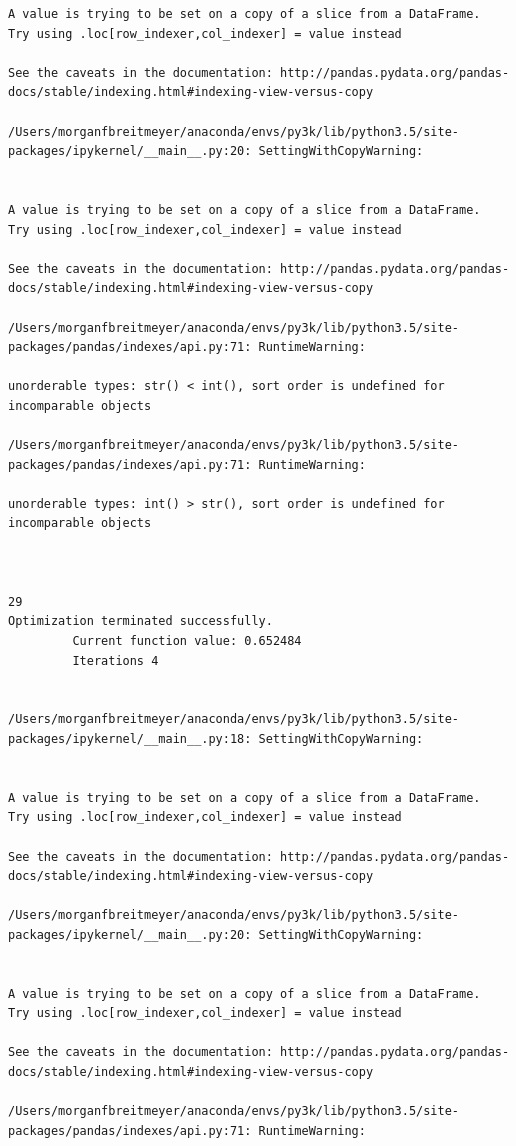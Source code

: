 \begin{lstlisting}
A value is trying to be set on a copy of a slice from a DataFrame.
Try using .loc[row_indexer,col_indexer] = value instead

See the caveats in the documentation: http://pandas.pydata.org/pandas-docs/stable/indexing.html#indexing-view-versus-copy

/Users/morganfbreitmeyer/anaconda/envs/py3k/lib/python3.5/site-packages/ipykernel/__main__.py:20: SettingWithCopyWarning:


A value is trying to be set on a copy of a slice from a DataFrame.
Try using .loc[row_indexer,col_indexer] = value instead

See the caveats in the documentation: http://pandas.pydata.org/pandas-docs/stable/indexing.html#indexing-view-versus-copy

/Users/morganfbreitmeyer/anaconda/envs/py3k/lib/python3.5/site-packages/pandas/indexes/api.py:71: RuntimeWarning:

unorderable types: str() < int(), sort order is undefined for incomparable objects

/Users/morganfbreitmeyer/anaconda/envs/py3k/lib/python3.5/site-packages/pandas/indexes/api.py:71: RuntimeWarning:

unorderable types: int() > str(), sort order is undefined for incomparable objects



29
Optimization terminated successfully.
         Current function value: 0.652484
         Iterations 4


/Users/morganfbreitmeyer/anaconda/envs/py3k/lib/python3.5/site-packages/ipykernel/__main__.py:18: SettingWithCopyWarning:


A value is trying to be set on a copy of a slice from a DataFrame.
Try using .loc[row_indexer,col_indexer] = value instead

See the caveats in the documentation: http://pandas.pydata.org/pandas-docs/stable/indexing.html#indexing-view-versus-copy

/Users/morganfbreitmeyer/anaconda/envs/py3k/lib/python3.5/site-packages/ipykernel/__main__.py:20: SettingWithCopyWarning:


A value is trying to be set on a copy of a slice from a DataFrame.
Try using .loc[row_indexer,col_indexer] = value instead

See the caveats in the documentation: http://pandas.pydata.org/pandas-docs/stable/indexing.html#indexing-view-versus-copy

/Users/morganfbreitmeyer/anaconda/envs/py3k/lib/python3.5/site-packages/pandas/indexes/api.py:71: RuntimeWarning:


\end{lstlisting}
